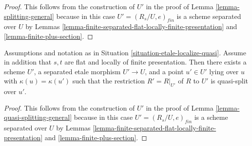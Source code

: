 \begin{proof}
This follows from the construction of $U'$ in the proof of
Lemma \ref{lemma-splitting-general}
because in this case $U' = (R_s/U, e)_{fin}$ is a scheme separated over
$U$ by
Lemmas \ref{lemma-finite-separated-flat-locally-finite-presentation} and
\ref{lemma-finite-plus-section}.
\end{proof}

\begin{lemma}
\label{lemma-quasi-splitting-scheme}
Assumptions and notation as in
Situation \ref{situation-etale-localize-quasi}.
Assume in addition that $s, t$ are flat and locally of finite presentation.
Then there exists a scheme $U'$, a separated etale morphism
$U' \to U$, and a point $u' \in U'$ lying over $u$ with
$\kappa(u) = \kappa(u')$ such that the restriction $R' = R|_{U'}$ of
$R$ to $U'$ is quasi-split over $u'$.
\end{lemma}

\begin{proof}
This follows from the construction of $U'$ in the proof of
Lemma \ref{lemma-quasi-splitting-general}
because in this case $U' = (R_s/U, e)_{fin}$ is a scheme separated
over $U$ by
Lemmas \ref{lemma-finite-separated-flat-locally-finite-presentation} and
\ref{lemma-finite-plus-section}.
\end{proof}












